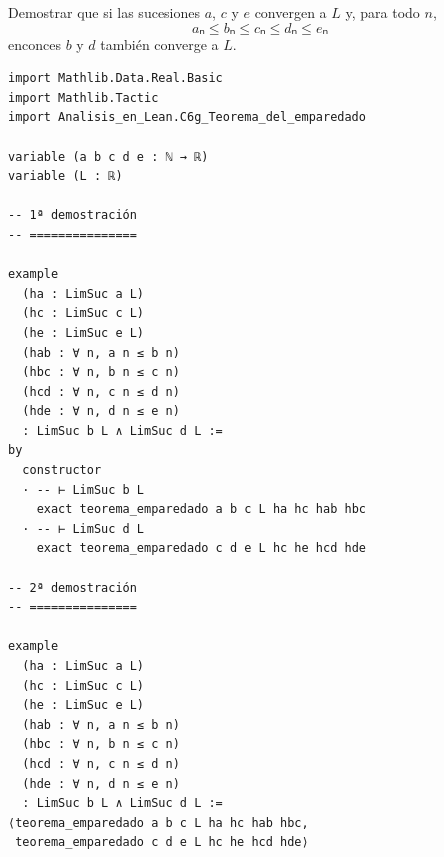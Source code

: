 \begin{ejercicio}
Demostrar que si las sucesiones \(a\), \(c\) y \(e\) convergen a \(L\) y, para todo
\(n\),
   \[aₙ ≤ bₙ ≤ cₙ ≤ dₙ ≤ eₙ\]
enconces \(b\) y \(d\) también converge a \(L\).
\end{ejercicio}

\begin{verbatim}
import Mathlib.Data.Real.Basic
import Mathlib.Tactic
import Analisis_en_Lean.C6g_Teorema_del_emparedado

variable (a b c d e : ℕ → ℝ)
variable (L : ℝ)

-- 1ª demostración
-- ===============

example
  (ha : LimSuc a L)
  (hc : LimSuc c L)
  (he : LimSuc e L)
  (hab : ∀ n, a n ≤ b n)
  (hbc : ∀ n, b n ≤ c n)
  (hcd : ∀ n, c n ≤ d n)
  (hde : ∀ n, d n ≤ e n)
  : LimSuc b L ∧ LimSuc d L :=
by
  constructor
  · -- ⊢ LimSuc b L
    exact teorema_emparedado a b c L ha hc hab hbc
  · -- ⊢ LimSuc d L
    exact teorema_emparedado c d e L hc he hcd hde

-- 2ª demostración
-- ===============

example
  (ha : LimSuc a L)
  (hc : LimSuc c L)
  (he : LimSuc e L)
  (hab : ∀ n, a n ≤ b n)
  (hbc : ∀ n, b n ≤ c n)
  (hcd : ∀ n, c n ≤ d n)
  (hde : ∀ n, d n ≤ e n)
  : LimSuc b L ∧ LimSuc d L :=
⟨teorema_emparedado a b c L ha hc hab hbc,
 teorema_emparedado c d e L hc he hcd hde⟩
\end{verbatim}


